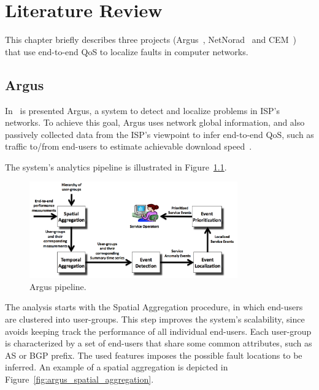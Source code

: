 \chapter{Literature Review}
\label{chap:literature_review}

This chapter briefly describes three projects
(Argus~\cite{argus_end_to_end_service_anomaly_detection_and_localization_from_an_isps_point_of_view},
NetNorad~\cite{netnorad}
and CEM~\cite{crowdsourcing_service_level_network_event_monitoring})
that use end-to-end QoS to localize faults in computer networks.

\section{Argus}

In~\cite{argus_end_to_end_service_anomaly_detection_and_localization_from_an_isps_point_of_view}
is presented Argus, a system to
detect and localize problems in ISP's networks. To achieve this goal, Argus uses
network global information, and also passively collected data from the ISP's
viewpoint to infer
end-to-end QoS, such as traffic to/from end-users to estimate achievable
download
speed~\cite{speed_testing_without_speed_tests_estimating_achievable_download_speed_from_passive_measurements}.

The system's analytics pipeline is illustrated in
Figure~\ref{fig:argus_pipeline}.

\begin{figure}[H]
    \centering
    \includegraphics[width=0.8\textwidth]{./figures/literature_review/argus_pipeline.png}
    \caption{Argus pipeline.~\cite{argus_end_to_end_service_anomaly_detection_and_localization_from_an_isps_point_of_view}}
\label{fig:argus_pipeline}
\end{figure}%

The analysis starts with the Spatial Aggregation procedure, in which
end-users are clustered into user-groups. This step improves the system's
scalability, since avoids keeping track the performance of all
individual end-users.
Each user-group is characterized by a set of end-users that share some common
attributes, such as AS or BGP prefix. The used features imposes the possible
fault locations to be inferred.
An example of a spatial aggregation is depicted in
Figure~\ref{fig:argus_spatial_aggregation}.

